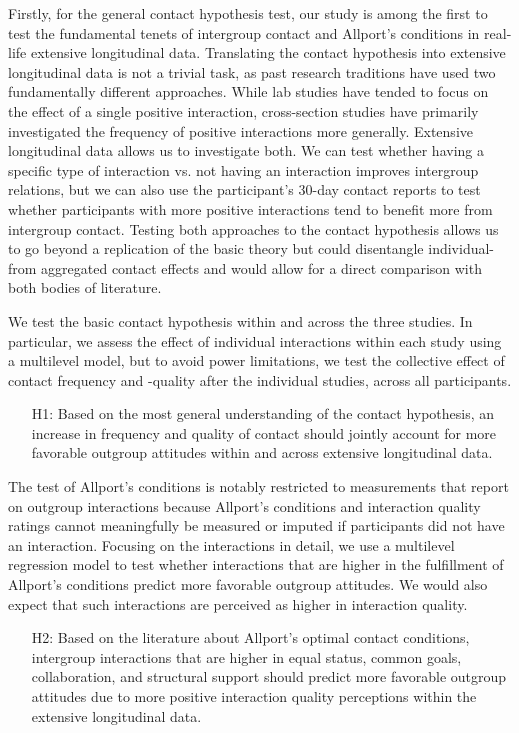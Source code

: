 \documentclass[man, 12pt, a4paper, mask]{apa7}
\theoremstyle{break}
\theoremstyle{plain}
\begin{document}
Firstly, for the general contact hypothesis test, our study is among the first to test the fundamental tenets of intergroup contact and Allport's conditions in real-life extensive longitudinal data. Translating the contact hypothesis into extensive longitudinal data is not a trivial task, as past research traditions have used two fundamentally different approaches. While lab studies have tended to focus on the effect of a single positive interaction, cross-section studies have primarily investigated the frequency of positive interactions more generally. Extensive longitudinal data allows us to investigate both. We can test whether having a specific type of interaction vs. not having an interaction improves intergroup relations, but we can also use the participant's 30-day contact reports to test whether participants with more positive interactions tend to benefit more from intergroup contact. Testing both approaches to the contact hypothesis allows us to go beyond a replication of the basic theory but could disentangle individual- from aggregated contact effects and would allow for a direct comparison with both bodies of literature. 

We test the basic contact hypothesis within and across the three studies. In particular, we assess the effect of individual interactions within each study using a multilevel model, but to avoid power limitations, we test the collective effect of contact frequency and -quality after the individual studies, across all participants.
\begin{enumerate}[leftmargin=1.5\parindent]
    \item[H1:] Based on the most general understanding of the contact hypothesis, an increase in frequency and quality of contact should jointly account for more favorable outgroup attitudes within and across extensive longitudinal data.
\end{enumerate}

The test of Allport's conditions is notably restricted to measurements that report on outgroup interactions because Allport's conditions and interaction quality ratings cannot meaningfully be measured or imputed if participants did not have an interaction. Focusing on the interactions in detail, we use a multilevel regression model to test whether interactions that are higher in the fulfillment of Allport's conditions predict more favorable outgroup attitudes. We would also expect that such interactions are perceived as higher in interaction quality.
\begin{enumerate}[leftmargin=1.5\parindent]
    \item[H2:] Based on the literature about Allport’s optimal contact conditions, intergroup interactions that are higher in equal status, common goals, collaboration, and structural support should predict more favorable outgroup attitudes due to more positive interaction quality perceptions within the extensive longitudinal data.
\end{enumerate}
\end{document}
